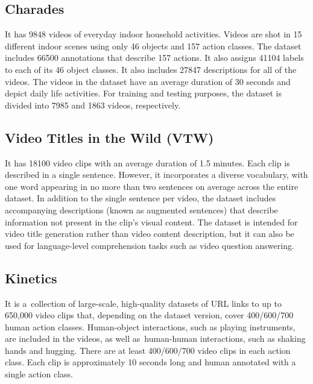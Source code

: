 \subsection{Charades}

\par It has 9848 videos of everyday indoor household activities. Videos are shot in 15 different indoor scenes using only 46 objects and 157 action classes. The dataset includes 66500 annotations that describe 157 actions. It also assigns 41104 labels to each of its 46 object classes. It also includes 27847 descriptions for all of the videos. The videos in the dataset have an average duration of 30 seconds and depict daily life activities. For training and testing purposes, the dataset is divided into 7985 and 1863 videos, respectively.

\subsection{Video Titles in the Wild (VTW)}

\par It has 18100 video clips with an average duration of 1.5 minutes. Each clip is described in a single sentence. However, it incorporates a diverse vocabulary, with one word appearing in no more than two sentences on average across the entire dataset. In addition to the single sentence per video, the dataset includes accompanying descriptions (known as augmented sentences) that describe information not present in the clip's visual content. The dataset is intended for video title generation rather than video content description, but it can also be used for language-level comprehension tasks such as video question answering.

\subsection{Kinetics}

\par It is a collection of large-scale, high-quality datasets of URL links to up to 650,000 video clips that, depending on the dataset version, cover 400/600/700 human action classes. Human-object interactions, such as playing instruments, are included in the videos, as well as human-human interactions, such as shaking hands and hugging. There are at least 400/600/700 video clips in each action class. Each clip is approximately 10 seconds long and human annotated with a single action class.


